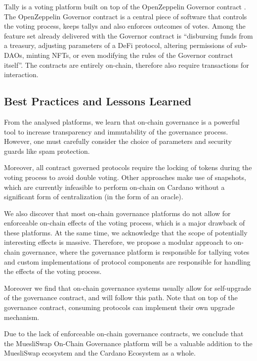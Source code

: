 \documentclass[11pt]{article}
\begin{document}
Tally is a voting platform built on top of the OpenZeppelin Governor contract \cite{Tally, OpenZeppelin}.
The OpenZeppelin Governor contract is a central piece of software that controls the voting process, keeps tallys and also enforces outcomes of votes.
Among the feature set already delivered with the Governor contract is ``disbursing funds from a treasury, adjusting parameters of a DeFi protocol, altering permissions of sub-DAOs, minting NFTs, or even modifying the rules of the Governor contract itself''.
The contracts are entirely on-chain, therefore also require transactions for interaction.

\subsection{Best Practices and Lessons Learned}

From the analysed platforms, we learn that on-chain governance is a powerful tool to increase transparency and immutability of the governance process.
However, one must carefully consider the choice of parameters and security guards like spam protection.

Moreover, all contract governed protocols require the locking of tokens during the voting process to avoid double voting.
Other approaches make use of snapshots, which are currently infeasible to perform on-chain on Cardano
without a significant form of centralization (in the form of an oracle).

We also discover that most on-chain governance platforms do not allow for enforceable on-chain effects of the voting process,
which is a major drawback of these platforms.
At the same time, we acknowledge that the scope of potentially interesting effects is massive.
Therefore, we propose a modular approach to on-chain governance, where the governance platform is responsible for tallying votes and
custom implementations of protocol components are responsible for handling the effects of the voting process.

Moreover we find that on-chain governance systems usually allow for self-upgrade of the governance contract,
and will follow this path.
Note that on top of the governance contract,
consuming protocols can implement their own upgrade mechanism.

Due to the lack of enforceable on-chain governance contracts, we conclude that the MuesliSwap On-Chain Governance platform will be a valuable addition to the MuesliSwap ecosystem and the Cardano Ecosystem as a whole.
\end{document}
